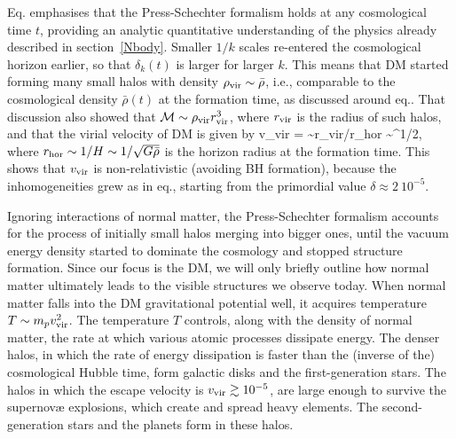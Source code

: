 \medskip

Eq. emphasises that the Press-Schechter  formalism holds at any cosmological time $t$, 
providing an analytic quantitative understanding of the physics already described in section~\ref{Nbody}.
Smaller $1/k$ scales  re-entered the cosmological horizon earlier, so that $\delta_k(t)$ is larger for larger $k$.
This means that DM started forming many small halos with density $\rho_{\rm vir} \sim \bar\rho$, i.e., comparable
to the cosmological density $\bar\rho(t)$ at the formation time, as discussed around eq..
That discussion also showed that ${\cal M} \sim \rho_{\rm vir} r_{\rm vir}^3$, where $r_{\rm vir}$ is the radius of such halos,
and that the virial velocity of DM is given by
\beq 
v_{\rm vir} =  \approx {} \sim r_{\rm vir}/r_{\rm hor} \sim \delta^{1/2},
\eeq
where $r_{\rm hor} \sim 1/H \sim 1/\sqrt{G \bar\rho}$ is the horizon radius at the formation time.
This shows that $v_{\rm vir}$ is non-relativistic (avoiding BH formation), because the
inhomogeneities grew as in eq., starting from the primordial value $\delta \approx 2~ 10^{-5}$.

Ignoring interactions of normal matter, the Press-Schechter  formalism accounts for
the process of initially small halos merging into bigger ones, until the vacuum energy density started to dominate the cosmology and stopped structure formation.
Since our focus is the DM, we will only briefly outline how normal matter ultimately leads to the visible structures we observe today.
When normal matter falls into the DM gravitational potential well, it acquires temperature $T \sim m_p v_{\rm vir}^2$.
The temperature $T$ controls, along with the density of normal matter,  the rate at which various atomic processes dissipate energy.
The denser halos, in which the rate of energy dissipation is faster than the (inverse of the) cosmological Hubble time,
form galactic disks and the first-generation stars.
The halos in which the escape velocity is $v_{\rm vir} \gtrsim 10^{-5}$, are large enough to survive the 
supernov\ae{} explosions, which create and spread heavy elements.
The second-generation stars and the planets  form in these halos.


